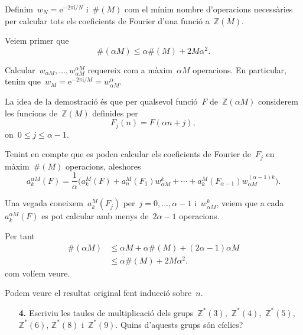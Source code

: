 \documentclass[a4paper]{article}
\theoremstyle{plain}
\theoremstyle{definition}
\newcommand{\iu}{\mathrm{i}}
\newcommand{\e}{\mathrm{e}}
\providecommand{\uppi}{\pi}
\newcommand{\ZZ}{\mathbb{Z}}
\begin{document}
Definim~\(w_{N} = \e^{-2\uppi\iu/N}\) i~\(\#(M)\) com el mínim nombre d'operacions
necessàries per calcular tots els coeficients de Fourier d'una funció
a~\(\ZZ(M)\).

Veiem primer que
\begin{equation}
    \label{ex3:eq1}
    \#(\alpha M)
    \leq
    \alpha\#(M)
    +
    2M\alpha^{2}.
\end{equation}

Calcular~\(w_{\alpha M},\dots,w_{\alpha M}^{\alpha M}\) requereix com a
màxim~\(\alpha M\) operacions.
En particular, tenim que~\(w_{M} = \e^{-2\uppi\iu/M} = w_{\alpha M}^{\alpha}\).

La idea de la demostració és que per qualsevol funció~\(F\) de~\(\ZZ(\alpha M)\)
considerem les funcions de~\(\ZZ(M)\) definides per
\[
    F_{j}(n) = F(\alpha n + j),
\]
on~\(0 \leq j \leq \alpha-1\).

Tenint en compte que es poden calcular els coeficients de Fourier de~\(F_{j}\)
en màxim~\(\#(M)\) operacions, aleshores
\[
    a_{k}^{\alpha M}(F)
    =
    \frac{1}{\alpha}
    \bigl(
        a_{k}^{M}(F)
        +
        a_{n}^{M}(F_{1})
        w_{\alpha M}^{k}
        + \cdots +
        a_{k}^{M}(F_{\alpha-1})
    w_{\alpha M}^{(\alpha-1)k}
    \bigr).
\]

Una vegada coneixem~\(a_{k}^{M}(F_{j})\) per~\(j=0,\dots,\alpha-1\)
i~\(w_{\alpha M}^{k}\), veiem que a cada~\(a_{k}^{\alpha M}(F)\) es pot calcular
amb menys de~\(2\alpha-1\) operacions.

Per tant
\begin{align*}
    \#(\alpha M)
    &\leq
    \alpha M + \alpha \#(M) + (2\alpha - 1)\alpha M \\
    &\leq \alpha \#(M) + 2M\alpha^{2}.
\end{align*}
com volíem veure.

Podem veure el resultat original fent inducció sobre~\(n\).

\begin{enumerate}
    \item[\textbf{4.}] Escriviu les taules de multiplicació dels
        grups~\(\ZZ^{\ast}(3)\),~\(\ZZ^{\ast}(4)\),~\(\ZZ^{\ast}(5)\),~\(\ZZ^{\ast}(6)\),
        \(\ZZ^{\ast}(8)\) i~\(\ZZ^{\ast}(9)\).
        Quins d'aquests grups són cíclics?
\end{enumerate}
\end{document}
